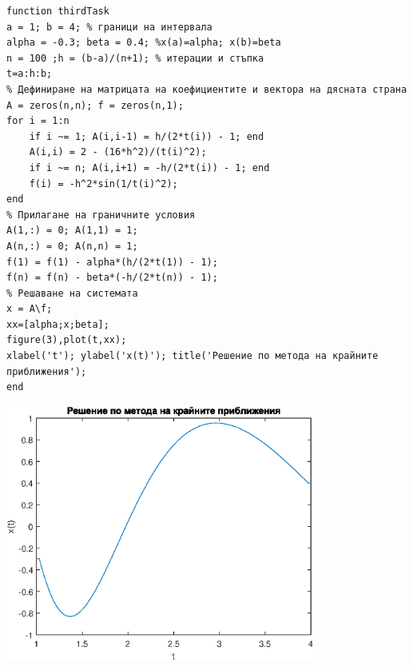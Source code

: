 \documentclass[a4paper,fleqn,12pt]{article}
\begin{document}
\begin{verbatim}
function thirdTask
a = 1; b = 4; % граници на интервала
alpha = -0.3; beta = 0.4; %x(a)=alpha; x(b)=beta
n = 100 ;h = (b-a)/(n+1); % итерации и стъпка
t=a:h:b;
% Дефиниране на матрицата на коефициентите и вектора на дясната страна
A = zeros(n,n); f = zeros(n,1);
for i = 1:n
    if i ~= 1; A(i,i-1) = h/(2*t(i)) - 1; end
    A(i,i) = 2 - (16*h^2)/(t(i)^2);
    if i ~= n; A(i,i+1) = -h/(2*t(i)) - 1; end
    f(i) = -h^2*sin(1/t(i)^2);
end
% Прилагане на граничните условия
A(1,:) = 0; A(1,1) = 1;
A(n,:) = 0; A(n,n) = 1;
f(1) = f(1) - alpha*(h/(2*t(1)) - 1);
f(n) = f(n) - beta*(-h/(2*t(n)) - 1);
% Решаване на системата
x = A\f;
xx=[alpha;x;beta];
figure(3),plot(t,xx);
xlabel('t'); ylabel('x(t)'); title('Решение по метода на крайните приближения');
end
\end{verbatim}
\begin{center}
  \includegraphics[width=4in]{thirdTask_01.eps}
\end{center}

\newpage
\end{document}
